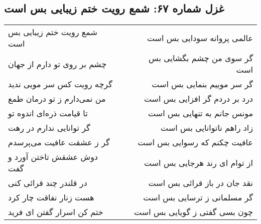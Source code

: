 \begin{center}
\section*{غزل شماره ۶۷: شمع رویت ختم زیبایی بس است}
\label{sec:067}
\begin{longtable}{l p{0.5cm} r}
شمع رویت ختم زیبایی بس است
&&
عالمی پروانه سودایی بس است
\\
چشم بر روی تو دارم از جهان
&&
گر سوی من چشم بگشایی بس است
\\
گرچه رویت کس سر مویی ندید
&&
گر سر موییم بنمایی بس است
\\
من نمی‌دارم ز تو درمان طمع
&&
درد بر دردم گر افزایی بس است
\\
تا قیامت ذره‌ای اندوه تو
&&
مونس جانم به تنهایی بس است
\\
گر توانایی ندارم در رهت
&&
زاد راهم ناتوانایی بس است
\\
گر ز عشقت عافیت می‌پرسدم
&&
عافیت چکنم که رسوایی بس است
\\
دوش عشقش تاختن آورد و گفت
&&
از توام ای رند هرجایی بس است
\\
در قلندر چند قرائی کنی
&&
نقد جان در باز قرائی بس است
\\
هست زنار نفاقت چار کرد
&&
گر مسلمانی ز ترسایی بس است
\\
ختم کن اسرار گفتن ای فرید
&&
چون بسی گفتی ز گویایی بس است
\\
\end{longtable}
\end{center}
